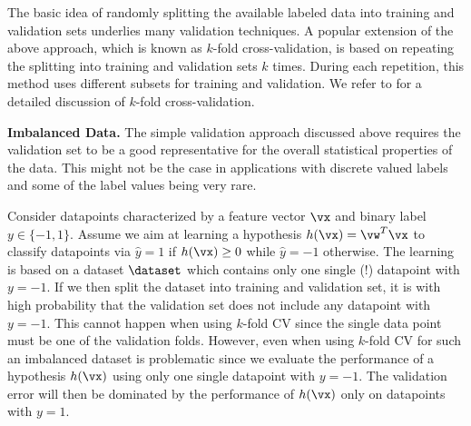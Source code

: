 \documentclass[12pt]{report}
\begin{document}

The basic idea of randomly splitting the available labeled data into training and 
validation sets underlies many validation techniques. A popular extension 
of the above approach, which is known as $k$-fold cross-validation, is based 
on repeating the splitting into training and validation sets $k$ times. During 
each repetition, this method uses different subsets for training and validation. 
We refer to \cite[Sec. 7.10]{hastie01statisticallearning} for a detailed discussion of $k$-fold 
cross-validation. 

{\bf Imbalanced Data.} 
The simple validation approach discussed above requires the validation set to be 
a good representative for the overall statistical properties of the data. This might 
not be the case in applications with discrete valued labels and some of the label 
values being very rare. 

Consider datapoints characterized by a feature vector $\vx$ and binary label $y \in \{-1,1\}$. 
Assume we aim at learning a hypothesis $h(\vx) = \vw^{T} \vx$ to classify datapoints 
via $\hat{y}=1$ if $h(\vx) \geq 0$ while $\hat{y}=-1$ otherwise. The learning is based 
on a dataset $\dataset$ which contains only one single (!) datapoint with $y=-1$. If 
we then split the dataset into training and validation set, it is with high probability that 
the validation set does not include any datapoint with $y=-1$. This cannot happen 
when using $k$-fold CV since the single data point must be one of the validation folds. 
However, even when using $k$-fold CV for such an imbalanced dataset is problematic since 
we evaluate the performance of a hypothesis $h(\vx)$ using only one single 
datapoint with $y=-1$. The validation error will then be dominated by the performance 
of $h(\vx)$ only on datapoints with $y=1$. 
\end{document}

